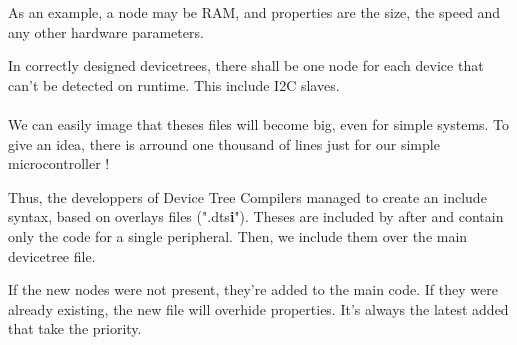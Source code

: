 As an example, a node may be RAM, and properties are the size, the speed and any other hardware
parameters.

In correctly designed devicetrees, there shall be one node for each device that can't be detected on 
runtime. This include I2C slaves.

\paragraph{}
We can easily image that theses files will become big, even for simple systems. To give an idea, there is
arround one thousand of lines just for our simple microcontroller !

Thus, the developpers of Device Tree Compilers managed to create an include syntax, based on overlays files
(".dts\textbf{i}"). Theses are included by after and contain only the code for a single peripheral.
Then, we include them over the main devicetree file. 

If the new nodes were not present, they're added to the main code. If they were already existing, the new 
file will overhide properties. 
It's always the latest added that take the priority.



